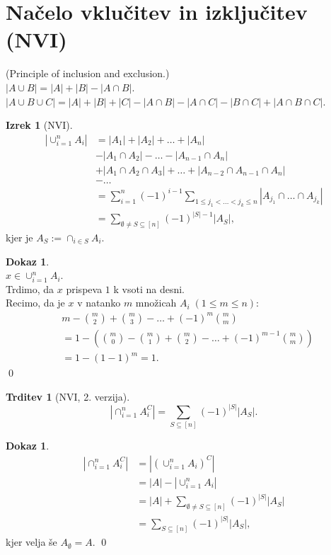 \documentclass[a4paper, 12pt]{book}
\theoremstyle{definition}
\newtheorem{claim}[counter]{Trditev}
\newtheorem{theorem}[counter]{Izrek}
\newtheorem{pro}[counter]{Dokaz}
\theoremstyle{remark}
\begin{document}
\section{Načelo vklučitev in izključitev (NVI)}

(Principle of inclusion and exclusion.) \\
$|A \cup B| = |A| + |B| - |A \cap B|$. \\
$|A \cup B \cup C| = |A| + |B| + |C| - |A \cap B| - |A \cap C| - |B \cap C| + |A \cap B \cap C|$.
\begin{theorem}[NVI]
  \begin{align*}
    |\cup_{i=1}^n A_i| &= |A_1| + |A_2| + \dots + |A_n| \\
    &- |A_1 \cap A_2| - \dots - |A_{n-1} \cap A_n| \\
    &+ |A_1 \cap A_2 \cap A_3| + \dots + |A_{n-2} \cap A_{n-1} \cap A_n| \\
    &- \dots \\
    &= \sum_{i=1}^{n} (-1)^{i-1} \sum_{1 \leq j_1 < \dots < j_k \leq n} |A_{j_1} \cap \dots \cap A_{j_k}| \\
    &= \sum_{\emptyset \neq S \subseteq [n]} (-1)^{|S|-1} |A_S|,
  \end{align*}
  kjer je $A_S := \cap_{i \in S} A_i$.
\end{theorem}
\begin{pro} \text{} \\
  $x \in \cup_{i=1}^n A_i$. \\
  Trdimo, da $x$ prispeva $1$ k vsoti na desni. \\
  Recimo, da je $x$ v natanko $m$ množicah $A_i \; (1 \leq m \leq n)$:
  \begin{align*}
    &m - \binom{m}{2} + \binom{m}{3} - \dots + (-1)^{m} \binom{m}{m} \\
    &= 1 - \left(\binom{m}{0} - \binom{m}{1} + \binom{m}{2} - \dots + (-1)^{m-1} \binom{m}{m}\right) \\
    &= 1 - (1-1)^m = 1.
  \end{align*}
  \qed
\end{pro}
\begin{claim}[NVI, 2. verzija]
  \begin{equation*}
    \left|\cap_{i=1}^n A_i^C\right| = \sum_{S \subseteq [n]} (-1)^{|S|} |A_S|.
  \end{equation*}
\end{claim}
\begin{pro}
  \begin{align*}
    \left|\cap_{i=1}^n A_i^C\right| &= \left|(\cup_{i=1}^n A_i)^C\right| \\
    &= |A| - |\cup_{i=1}^n A_i| \\
    &= |A| + \sum_{\emptyset \neq S \subseteq [n]} (-1)^{|S|} |A_S| \\
    &= \sum_{S \subseteq [n]} (-1)^{|S|} |A_S|,
  \end{align*}
  kjer velja še $A_{\emptyset} = A$.
  \qed
\end{pro}
\end{document}
